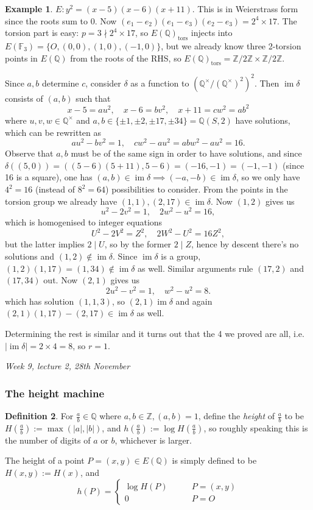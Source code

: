 \documentclass{article}
\newcommand{\F}{\mathbb{F}}
\newcommand{\Z}{\mathbb{Z}}
\newcommand{\Q}{\mathbb{Q}}
\newcommand{\im}{\operatorname{im}}
\theoremstyle{definition}
\newtheorem{defn}{Definition}[subsection]
\newtheorem{example}[defn]{Example}
\begin{document}
\begin{example}
$E:y^2=(x-5)(x-6)(x+11)$. This is in Weierstrass form since the roots sum to 0. Now $(e_1-e_2)(e_1-e_3)(e_2-e_3)=2^4\times 17$. The torsion part is easy: $p=3\nmid 2^4\times 17$, so $E(\Q)_{\operatorname{tors}}$ injects into $E(\F_3)=\{O,(0,0),(1,0),(-1,0)\}$, but we already know three 2-torsion points in $E(\Q)$ from the roots of the RHS, so $E(\Q)_{\operatorname{tors}}=\Z/2\Z\times\Z/2\Z$.

Since $a,b$ determine $c$, consider $\delta$ as a function to $\left(\Q^\times/\left(\Q^\times\right)^2\right)^2$. Then $\im\delta$ consists of $(a,b)$ such that
\[
x-5=au^2,\quad x-6=bv^2,\quad x+11=cw^2=ab^2
\]
where $u,v,w\in\Q^\times$ and $a,b\in\{\pm 1,\pm 2,\pm 17,\pm 34\}=\Q(S,2)$ have solutions, which can be rewritten as
\[
au^2-bv^2=1,\quad cw^2-au^2=abw^2-au^2=16.
\]
Observe that $a,b$ must be of the same sign in order to have solutions, and since $\delta((5,0))=((5-6)(5+11),5-6)=(-16,-1)=(-1,-1)$ (since 16 is a square), one has $(a,b)\in\im\delta\implies(-a,-b)\in\im\delta$, so we only have $4^2=16$ (instead of $8^2=64$) possibilities to consider. From the points in the torsion group we already have $(1,1),(2,17)\in\im\delta$. Now $(1,2)$ gives us
\[
u^2-2v^2=1,\quad 2w^2-u^2=16,
\]
which is homogenised to integer equations
\[
U^2-2V^2=Z^2,\quad 2W^2-U^2=16Z^2,
\]
but the latter implies $2\mid U$, so by the former $2\mid Z$, hence by descent there's no solutions and $(1,2)\notin\im\delta$. Since $\im\delta$ is a group, $(1,2)(1,17)=(1,34)\notin\im\delta$ as well. Similar arguments rule $(17,2)$ and $(17,34)$ out. Now $(2,1)$ gives us
\[
2u^2-v^2=1,\quad w^2-u^2=8.
\]
which has solution $(1,1,3)$, so $(2,1)\im\delta$ and again $(2,1)(1,17)-(2,17)\in\im\delta$ as well.

Determining the rest is similar and it turns out that the 4 we proved are all, i.e. $|\!\im\delta|=2\times 4=8$, so $r=1$.
\end{example}

\begin{flushright}
\textit{Week 9, lecture 2, 28th November}
\end{flushright}

\subsubsection{The height machine}
\begin{defn}
For $\frac{a}{b}\in\Q$ where $a,b\in\Z,(a,b)=1$, define the \textit{height} of $\frac{a}{b}$ to be $H\left(\frac{a}{b}\right):=\max(|a|,|b|)$, and $h\left(\frac{a}{b}\right):=\log H\left(\frac{a}{b}\right)$, so roughly speaking this is the number of digits of $a$ or $b$, whichever is larger.

The height of a point $P=(x,y)\in E(\Q)$ is simply defined to be $H(x,y):=H(x)$, and
\[
h(P)=\left\{\begin{aligned}
\log H(P)&\qquad P=(x,y) \\
0&\qquad P=O
\end{aligned} \right.
\]
\end{defn}
\end{document}
